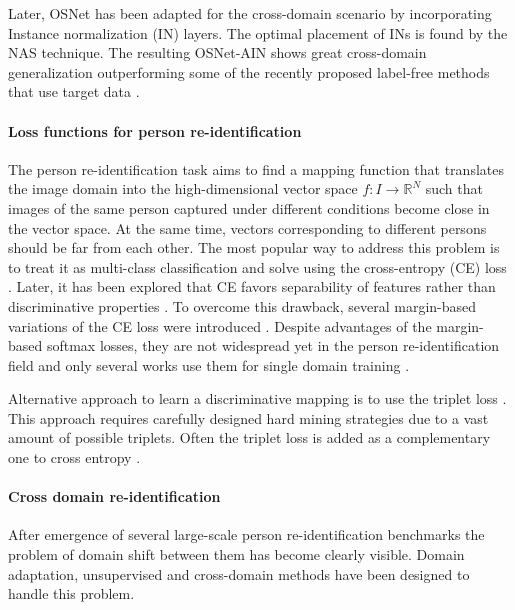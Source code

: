 \documentclass[a4paper,conference]{IEEEtran}
\begin{document}
Later, OSNet has been adapted for the cross-domain
scenario \cite{zhou2019learning} by incorporating Instance normalization \cite{instance} (IN)
layers. The optimal placement of INs is found by the NAS
\cite{Dong2019SearchingFA} technique. The resulting OSNet-AIN shows great
cross-domain generalization outperforming some of the recently proposed
label-free methods that use target data \cite{Yu2019UnsupervisedPR,
  Yang2019PatchBasedDF}.

\paragraph{Loss functions for person re-identification}

The person re-identification task aims to find a mapping function that
translates the image domain into the high-dimensional vector space
$f:I\to\mathbb{R}^N$ such that images of the same person captured under
different conditions become close in the vector space. At the same time, vectors
corresponding to different persons should be far from each other.  The most
popular way to address this problem is to treat it as multi-class classification
and solve using the cross-entropy (CE) loss
\cite{zheng2016person,Xiao2016LearningDF}.  Later, it has been explored that CE
favors separability of features rather than discriminative properties
\cite{lmSoftmax, centerLoss}. To overcome this drawback,
several margin-based variations of the CE loss were introduced
\cite{amSoftmax,deng2018arcface}.  Despite advantages of the margin-based
softmax losses, they are not widespread yet in the person re-identification
field and only several works use them for single domain training \cite{SphereReID,
  izutov2018fast, Luo2018SpectralFT}.

Alternative approach to learn a discriminative mapping is to use the triplet
loss \cite{inDefenceTriplet1, inDefenceTriplet2}.  This approach requires
carefully designed hard mining strategies due to a vast amount of possible
triplets. Often the triplet loss is added as a complementary one to cross entropy
\cite{mgn,Luo2019BagOT,abd}.

\paragraph{Cross domain re-identification}

After emergence of several large-scale person re-identification benchmarks
\cite{market, duke2, MSMT17} the problem of domain shift between them has become
clearly visible.  Domain adaptation, unsupervised and cross-domain methods have
been designed to handle this problem.
\end{document}
